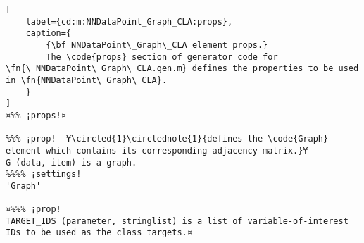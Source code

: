 \documentclass{tufte-handout}
\begin{document}
\begin{lstlisting}[
	label={cd:m:NNDataPoint_Graph_CLA:props},
	caption={
		{\bf NNDataPoint\_Graph\_CLA element props.}
		The \code{props} section of generator code for \fn{\_NNDataPoint\_Graph\_CLA.gen.m} defines the properties to be used in \fn{NNDataPoint\_Graph\_CLA}.
	}
]
¤%% ¡props!¤

%%% ¡prop!  ¥\circled{1}\circlednote{1}{defines the \code{Graph} element which contains its corresponding adjacency matrix.}¥
G (data, item) is a graph.
%%%% ¡settings!
'Graph'

¤%%% ¡prop!
TARGET_IDS (parameter, stringlist) is a list of variable-of-interest IDs to be used as the class targets.¤

\end{lstlisting}

\clearpage
\end{document}
